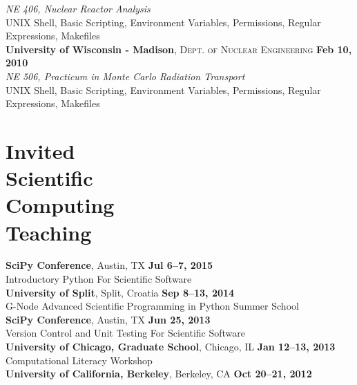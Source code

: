 \documentclass[margin,line]{resume}
\begin{document}
\begin{resume}
               \textsl{NE 406, Nuclear Reactor Analysis}\\
               UNIX Shell, Basic Scripting, Environment Variables, Permissions, Regular Expressions, Makefiles
               \vspace{2mm}\\
    \textbf{University of Wisconsin - Madison}, \textsc{Dept. of Nuclear
    Engineering} \hfill \textbf{Feb 10, 2010}\\
               \textsl{NE 506, Practicum in Monte Carlo Radiation Transport}\\
               UNIX Shell, Basic Scripting, Environment Variables, Permissions, Regular Expressions, Makefiles
               \vspace{2mm}

    \section{\mysidestyle Invited\\Scientific\\Computing\\Teaching}
    \textbf{SciPy Conference}, Austin, TX \hfill \textbf{Jul 6--7, 2015}\\
    Introductory Python For Scientific Software
               \vspace{2mm}\\
    \textbf{University of Split}, Split, Croatia \hfill \textbf{Sep 8--13, 2014}\\
    G-Node Advanced Scientific Programming in Python Summer School
               \vspace{2mm}\\
    \textbf{SciPy Conference}, Austin, TX \hfill \textbf{Jun 25, 2013}\\
    Version Control and Unit Testing For Scientific Software
               \vspace{2mm}\\
    \textbf{University of Chicago, Graduate School}, Chicago, IL \hfill \textbf{Jan 12--13, 2013}\\
    Computational Literacy Workshop
               \vspace{2mm}\\
    \textbf{University of California, Berkeley}, Berkeley, CA \hfill \textbf{Oct 20--21, 2012}\\

\end{resume}
\end{document}
